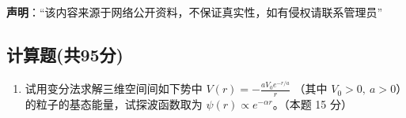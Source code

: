 
\textbf{声明}：“该内容来源于网络公开资料，不保证真实性，如有侵权请联系管理员”

\subsection{计算题(共95分)}
\begin{enumerate}
\item 试用变分法求解三维空间间如下势中 $V(r) = -\frac{aV_0 e^{-r/a}}{r}$ （其中 $V_0 > 0, \ a > 0$）的粒子的基态能量，试探波函数取为 $\psi(r) \propto e^{-\alpha r}$。（本题 15 分）
\end{enumerate}
